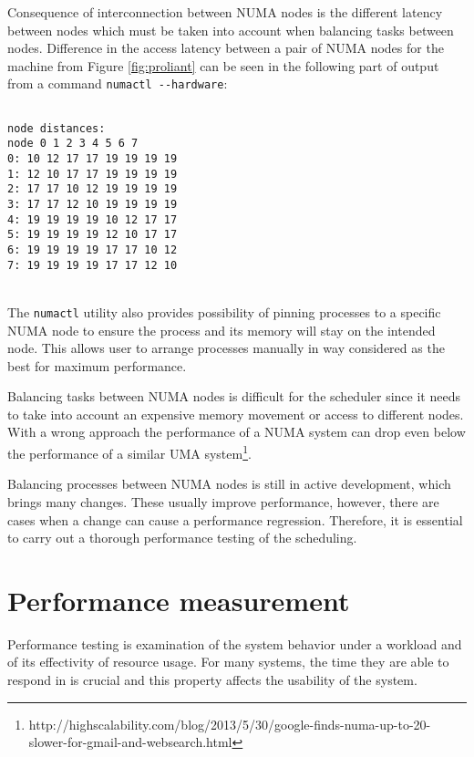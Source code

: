 Consequence of interconnection between NUMA nodes is the different latency
between nodes which must be taken into account when balancing tasks between
nodes. Difference in the access latency between a pair of NUMA nodes for the
machine from Figure \ref{fig:proliant} can be seen in the following part of
output from a command \verb|numactl --hardware|:

\begin{minipage}{\linewidth}
\begin{verbatim}

node distances:
node 0 1 2 3 4 5 6 7
0: 10 12 17 17 19 19 19 19
1: 12 10 17 17 19 19 19 19
2: 17 17 10 12 19 19 19 19
3: 17 17 12 10 19 19 19 19
4: 19 19 19 19 10 12 17 17
5: 19 19 19 19 12 10 17 17
6: 19 19 19 19 17 17 10 12
7: 19 19 19 19 17 17 12 10
\end{verbatim}
\end{minipage}\\

The \texttt{numactl} utility also provides possibility of pinning processes to a
specific NUMA node to ensure the process and its memory will stay on the
intended node. This allows user to arrange processes manually in way considered
as the best for maximum performance.

Balancing tasks between NUMA nodes is difficult for the scheduler since it needs
to take into account an expensive memory movement or access to different nodes.
With a wrong approach the performance of a NUMA system can drop even below the
performance of a similar UMA
system\footnote{http://highscalability.com/blog/2013/5/30/google-finds-numa-up-to-20-slower-for-gmail-and-websearch.html}.

Balancing processes between NUMA nodes is still in active development, which
brings many changes. These usually improve performance, however, there are cases
when a change can cause a performance regression. Therefore, it is essential to
carry out a thorough performance testing of the scheduling.



\chapter{Performance measurement} \label{ch:measurement}
Performance testing is examination of the system behavior under a workload and of its
effectivity of resource usage. For many systems, the time they are able to
respond in is crucial and this property affects the usability of the system.

